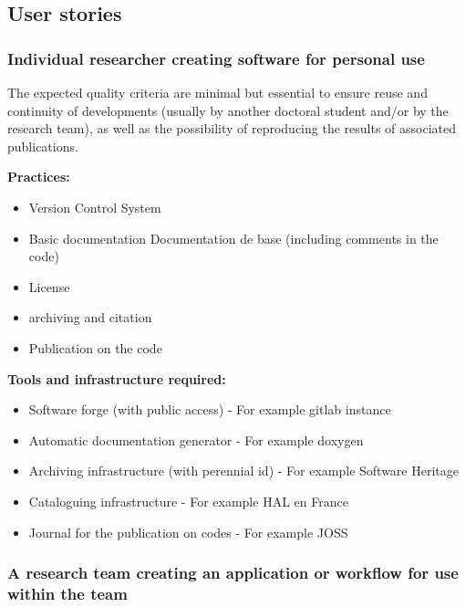 \subsection{User stories}

\subsubsection{Individual researcher creating software for personal use} 

The expected quality criteria are minimal but essential to ensure
reuse and continuity of developments (usually by another doctoral
student and/or by the research team), as well as the possibility of
reproducing the results of associated publications. 

{\bf Practices:}
\begin{itemize}
\item Version Control System
\item Basic documentation Documentation de base (including comments in the code)
\item License 
\item archiving and citation
\item Publication on the code
\end{itemize}

{\bf Tools and infrastructure required:}
\begin{itemize}
\item Software forge (with public access) - For example gitlab instance
\item Automatic documentation generator - For example doxygen
\item Archiving infrastructure (with perennial id) - For example Software Heritage
\item Cataloguing infrastructure - For example HAL en France
\item Journal for the publication on codes - For example JOSS
\end{itemize}


\subsubsection{A research team creating an application or workflow for use within the team}

